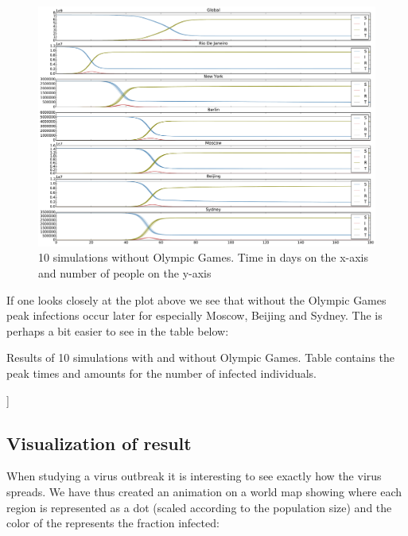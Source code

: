 \begin{figure}[H]
	\centering
	\includegraphics[width=1.0 \linewidth]{plots/no_rio.pdf}
	\caption{10 simulations without Olympic Games. Time in days on the x-axis and number of people on the y-axis}
\end{figure}

If one looks closely at the plot above we see that without the Olympic Games peak infections occur later for especially Moscow, Beijing and Sydney. The is perhaps a bit easier to see in the table below:

\begin{table}[H]
	\centering
	
	\caption{Results of 10 simulations with and without Olympic Games. Table contains the peak times and amounts for the number of infected individuals.}
\end{table}]


\subsection{Visualization of result}
When studying a virus outbreak it is interesting to see exactly how the virus spreads. We have thus created an animation on a world map showing where each region is represented as a dot (scaled according to the population size) and the color of the represents the fraction infected: